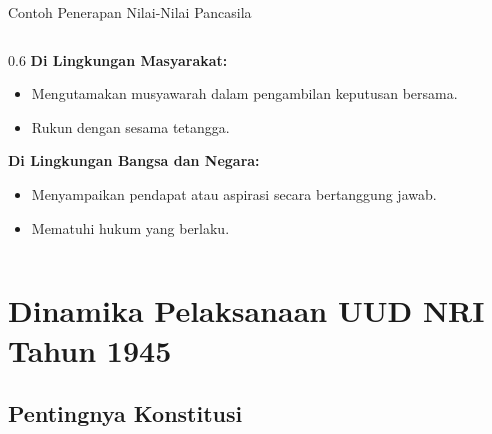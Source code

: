 \documentclass[11pt, aspectratio=169]{beamer}
\begin{document}
\begin{frame}{Contoh Penerapan Nilai-Nilai Pancasila}
\begin{columns}[c]
\begin{column}{0.6\textwidth}
            \vspace{1.5mm}
            \textbf{\color{accentC}Di Lingkungan Masyarakat:}
            \begin{itemize}
                \setlength{\itemsep}{1pt}
                \setlength{\parskip}{0pt}
                \item Mengutamakan musyawarah dalam pengambilan keputusan bersama.
                \item Rukun dengan sesama tetangga.
            \end{itemize}

            \vspace{1.5mm}
            \textbf{\color{primary}Di Lingkungan Bangsa dan Negara:}
            \begin{itemize}
                \setlength{\itemsep}{1pt}
                \setlength{\parskip}{0pt}
                \item Menyampaikan pendapat atau aspirasi secara bertanggung jawab.
                \item Mematuhi hukum yang berlaku.
            \end{itemize}
        \end{column}
    \end{columns}
\end{frame}

\section{Dinamika Pelaksanaan UUD NRI Tahun 1945}
\subsection{Pentingnya Konstitusi}
\end{document}
